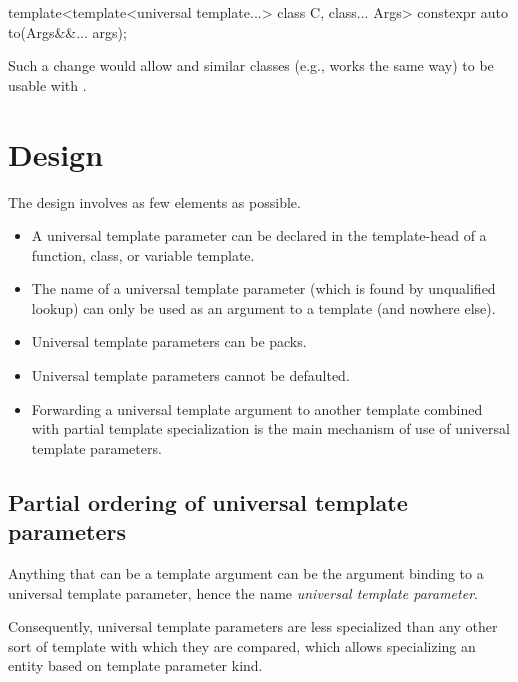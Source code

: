 \documentclass{wg21}
\begin{document}
\begin{colorblock}
template<template<universal template...> class C, class... Args>
constexpr auto to(Args&&... args);
\end{colorblock}

Such a change would allow  and similar classes (e.g.,  works the same way) to be usable with .

\section{Design}

The design involves as few elements as possible.

\begin{itemize}
\item A universal template parameter can be declared in the template-head of a function, class, or variable template.
\item The name of a universal template parameter (which is found by unqualified lookup) can only be used as an argument to a template (and nowhere else).
\item Universal template parameters can be packs.
\item Universal template parameters cannot be defaulted.
\item Forwarding a universal template argument to another template combined with partial template specialization is the main mechanism of use of universal template parameters.
\end{itemize}

\subsection{Partial ordering of universal template parameters}

Anything that can be a template argument can be the argument binding to a universal template parameter, hence the name \emph{universal template parameter}.

Consequently, universal template parameters are less specialized than any other sort of template with which they are compared,
which allows specializing an entity based on template parameter kind.

\end{document}
